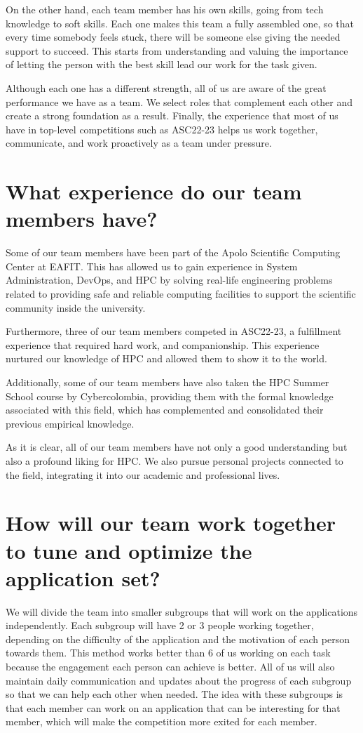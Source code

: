 \documentclass[11pt,a4paper,twocolumn]{article}
\begin{document}
On the other hand, each team member has his own skills, going from tech knowledge to soft skills. Each one makes this team a fully assembled one, so that every time somebody feels stuck, there will be someone else giving the needed support to succeed. This starts from understanding and valuing the importance of letting the person with the best skill lead our work for the task given.

Although each one has a different strength, all of us are aware of the great performance we have as a team. We select roles that complement each other and create a strong foundation as a result. Finally, the experience that most of us have in top-level competitions such as ASC22-23 helps us work together, communicate, and work proactively as a team under pressure.

\section{What experience do our team members have?}

Some of our team members have been part of the Apolo Scientific Computing Center at EAFIT. This has allowed us to gain experience in System Administration, DevOps, and HPC by solving real-life engineering problems related to providing safe and reliable computing facilities to support the scientific community inside the university.

Furthermore, three of our team members competed in ASC22-23, a fulfillment experience that required hard work, and companionship. This experience nurtured our knowledge of HPC and allowed them to show it to the world.

Additionally, some of our team members have also taken the HPC Summer School course by Cybercolombia, providing them with the formal knowledge associated with this field, which has complemented and consolidated their previous empirical knowledge.

As it is clear, all of our team members have not only a good understanding but also a profound liking for HPC. We also pursue personal projects connected to the field, integrating it into our academic and professional lives.

\section{How will our team work together to tune and optimize the application set?}

We will divide the team into smaller subgroups that will work on the applications independently. Each subgroup will have 2 or 3 people working together, depending on the difficulty of the application and the motivation of each person towards them. This method works better than 6 of us working on each task because the engagement each person can achieve is better. All of us will also maintain daily communication and updates about the progress of each subgroup so that we can help each other when needed. The idea with these subgroups is that each member can work on an application that can be interesting for that member, which will make the competition more exited for each member.
\end{document}
